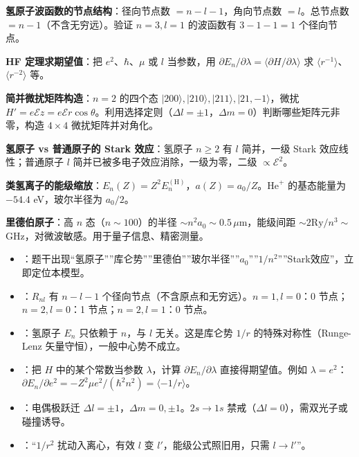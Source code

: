 \begin{drillbox}[训练点与考法变体]
 \textbf{氢原子波函数的节点结构}：径向节点数 $=n-l-1$，角向节点数 $=l$。总节点数 $=n-1$（不含无穷远）。验证 $n=3,l=1$ 的波函数有 $3-1-1=1$ 个径向节点。

 \textbf{HF 定理求期望值}：把 $e^2$、$\hbar$、$\mu$ 或 $l$ 当参数，用 $\partial E_n/\partial\lambda=\langle\partial H/\partial\lambda\rangle$ 求 $\langle r^{-1}\rangle$、$\langle r^{-2}\rangle$ 等。

 \textbf{简并微扰矩阵构造}：$n=2$ 的四个态 $|200\rangle,|210\rangle,|211\rangle,|21,-1\rangle$，微扰 $H'=e\mathcal{E}z=e\mathcal{E}r\cos\theta$。利用选择定则（$\Delta l=\pm1$，$\Delta m=0$）判断哪些矩阵元非零，构造 $4\times4$ 微扰矩阵并对角化。

 \textbf{氢原子 vs 普通原子的 Stark 效应}：氢原子 $n\geq2$ 有 $l$ 简并，一级 Stark 效应线性；普通原子 $l$ 简并已被多电子效应消除，一级为零，二级 $\propto\mathcal{E}^2$。

 \textbf{类氢离子的能级缩放}：$E_n(Z)=Z^2E_n^{(\text{H})}$，$a(Z)=a_0/Z$。$\text{He}^+$ 的基态能量为 $-54.4$ eV，玻尔半径为 $a_0/2$。

 \textbf{里德伯原子}：高 $n$ 态（$n\sim100$）的半径 $\sim n^2a_0\sim0.5\,\mu$m，能级间距 $\sim 2\text{Ry}/n^3\sim$ GHz，对微波敏感。用于量子信息、精密测量。
\end{drillbox}

\begin{tipbox}[快速识别与解题技巧]
\begin{itemize}
    \item {}：题干出现``氢原子''''库仑势''''里德伯''''玻尔半径''''$a_0$''''$1/n^2$''''Stark效应''，立即定位本模型。
    \item {}：$R_{nl}$ 有 $n-l-1$ 个径向节点（不含原点和无穷远）。$n=1,l=0$：0 节点；$n=2,l=0$：1 节点；$n=2,l=1$：0 节点。
    \item {}：氢原子 $E_n$ 只依赖于 $n$，与 $l$ 无关。这是库仑势 $1/r$ 的特殊对称性（Runge-Lenz 矢量守恒），一般中心势不成立。
    \item {}：把 $H$ 中的某个常数当参数 $\lambda$，计算 $\partial E_n/\partial\lambda$ 直接得期望值。例如 $\lambda=e^2$：$\partial E_n/\partial e^2=-Z^2\mu e^2/(\hbar^2n^2)=\langle-1/r\rangle$。
    \item {}：电偶极跃迁 $\Delta l=\pm1$，$\Delta m=0,\pm1$。$2s\to1s$ 禁戒（$\Delta l=0$），需双光子或碰撞诱导。
    \item {}：``$1/r^2$ 扰动入离心，有效 $l$ 变 $l'$，能级公式照旧用，只需 $l\to l'$''。
\end{itemize}
\end{tipbox}


